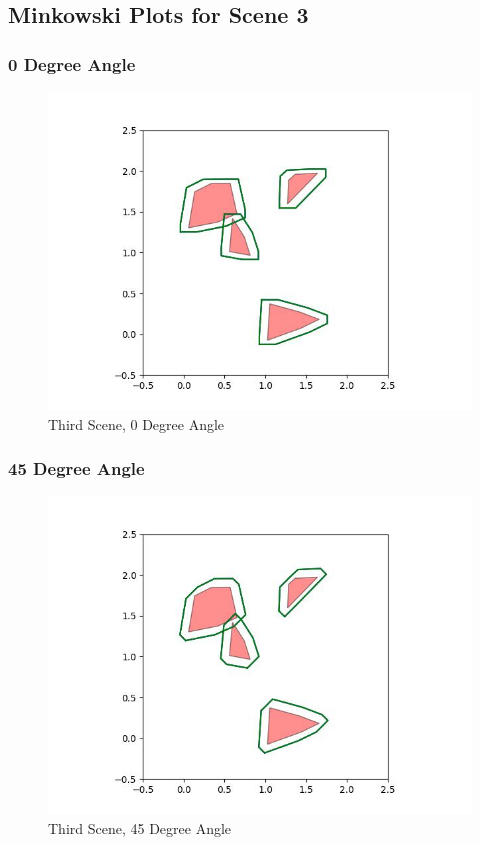 \documentclass{article}
\begin{document}
\newpage
\subsection{Minkowski Plots for Scene 3}
\subsubsection{0 Degree Angle}
\begin{figure}[h!]
	\includegraphics[width= 0.9 \linewidth]{Problem3_minkowski3_0.jpg}
	\centering
	\caption{Third Scene, 0 Degree Angle}
	\label{Problem3_minkowski3_0.jpg}
\end{figure}

\newpage
\subsubsection{45 Degree Angle}
\begin{figure}[h!]
	\includegraphics[width= 0.9 \linewidth]{Problem3_minkowski3_45.jpg}
	\centering
	\caption{Third Scene, 45 Degree Angle}
	\label{Problem3_minkowski3_45.jpg}
\end{figure}
\end{document}
